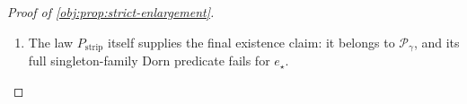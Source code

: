 \begin{proof}[Proof of \cref{obj:prop:strict-enlargement}]
\begin{enumerate}
Finally, conditioning on \(X\) and using
\(P_{\mathrm{strip}}(A=1\mid X)=e_\star(X)\) gives the numerator and denominator identities
\[
N_{\mathrm{strip}}(h)
=
\int_{\mathcal Q_{\mathrm{ctr},h}}
\left(\frac{x_2-1/2}{h}\right)^2e_\star(x)\,dx,
\qquad
D_{\mathrm{strip}}(h)
=
\int_{\mathcal Q_{\mathrm{ctr},h}}e_\star(x)\,dx.
\]
All integrands are nonnegative. Dividing the numerator upper bound by the positive denominator lower bound therefore yields
\[
0\le T_{\mathrm{strip}}(h)\le G_{\mathrm{strip}}(h),
\qquad 0<h\le1/2.
\]
The squeeze theorem proves
\[
\lim_{h\downarrow0}T_{\mathrm{strip}}(h)=0,
\]
which is exactly the asserted normalized treated-design limit.

\item The law \(P_{\mathrm{strip}}\) itself supplies the final existence claim: it belongs to \(\mathcal P_\gamma\), and its full singleton-family Dorn predicate fails for \(e_\star\).
\end{enumerate}
\end{proof}

